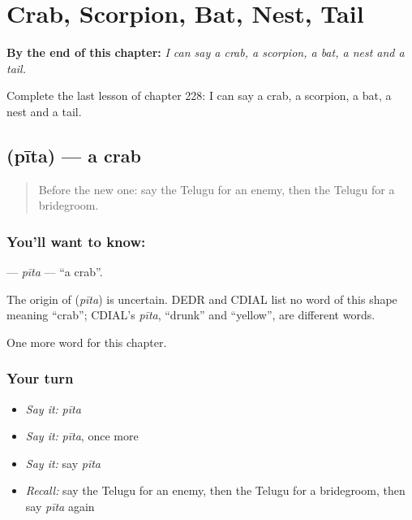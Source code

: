 
\chapter{Crab, Scorpion, Bat, Nest, Tail}
\label{ch:te-crab-scorpion-bat-nest-tail}

\begin{chapteropening}
\textbf{By the end of this chapter:} \emph{I can say a crab, a scorpion, a bat, a nest and a tail.}

Complete the last lesson of chapter 228: I can say a crab, a scorpion, a bat, a nest and a tail.
\end{chapteropening}

\section[\texorpdfstring{\te{పీత} (pīta)}{పీత (pīta)}]{ (pīta) — a crab}

\label{lesson:TE-C228-pita}



\begin{quote}
Before the new one: say the Telugu for an enemy, then the Telugu for a bridegroom.
\end{quote}

\subsection*{You'll want to know: }
\textbf{} — \emph{pīta} — \textquotedblleft{}a crab\textquotedblright{}.

\begin{cousinweb}
The origin of \textbf{} (\emph{pīta}) is uncertain. DEDR and CDIAL list no word of this shape meaning \textquotedblleft{}crab\textquotedblright{}; CDIAL's \emph{pīta}, \textquotedblleft{}drunk\textquotedblright{} and \textquotedblleft{}yellow\textquotedblright{}, are different words.
\end{cousinweb}

\begin{grammarlens}[title={What you've built}]
One more word for this chapter.
\end{grammarlens}

\subsection*{Your turn}
\begin{itemize}
\raggedright
  \item \emph{Say it:} \emph{pīta}
  \item \emph{Say it:} \emph{pīta}, once more
  \item \emph{Say it:} say \emph{pīta}
  \item \emph{Recall:} say the Telugu for an enemy, then the Telugu for a bridegroom, then say \emph{pīta} again
\end{itemize}


